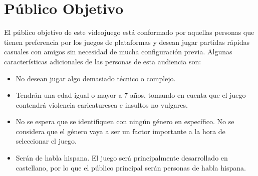 \section{P\'ublico Objetivo}

El público objetivo de este videojuego está conformado por aquellas personas que
tienen preferencia por los juegos de plataformas y desean jugar partidas rápidas
casuales con amigos sin necesidad de mucha configuración previa. Algunas
características adicionales de las personas de esta audiencia son:

\begin{itemize}
    \item No desean jugar algo demasiado técnico o complejo.
    \item Tendrán una edad igual o mayor a 7 años, tomando en cuenta que el
    juego contendrá violencia caricaturesca e insultos no vulgares.
    \item No se espera que se identifiquen con ningún género en específico. No se considera que el género
    vaya a ser un factor importante a la hora de seleccionar el juego.
    \item Serán de habla hispana. El juego será principalmente desarrollado en
    castellano, por lo que el público principal serán personas de habla hispana.
\end{itemize}

